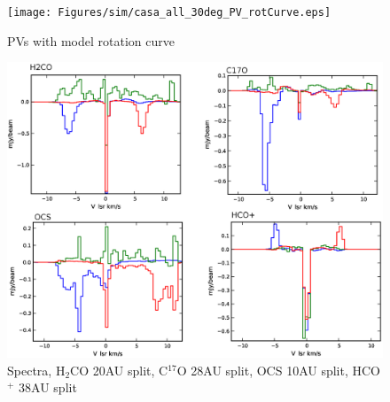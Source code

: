 \documentclass[useAMS,usenatbib]{mn2e}
\begin{document}
%


%

%

\begin{figure}
 \texttt{[image: Figures/sim/casa\_all\_30deg\_PV\_rotCurve.eps]}

 \caption{PVs with model rotation curve}
\end{figure}


\begin{figure}
 \includegraphics[width=168mm]{Figures/sim/casa_all_spectra.eps}

 \caption{Spectra, H$_2$CO 20AU split, C$^{17}$O 28AU split, OCS 10AU split, HCO$^+$ 38AU split}
\end{figure}
\end{document}
